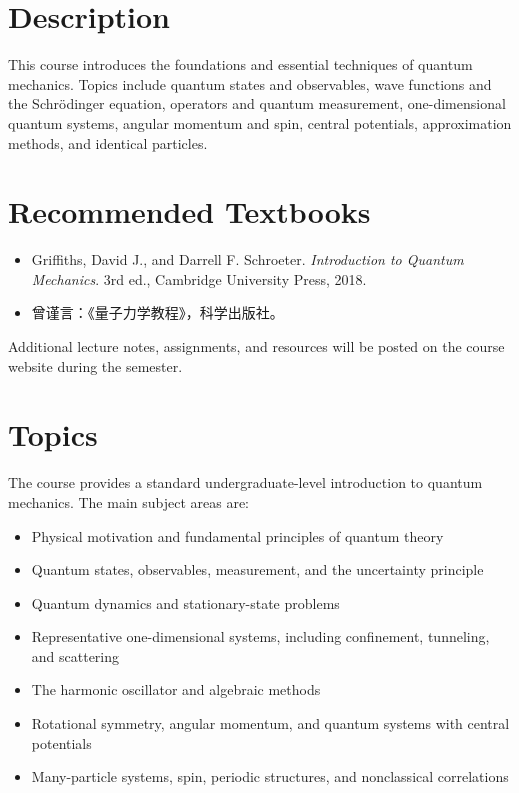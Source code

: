 \documentclass[UTF8]{ctexart}
\begin{document}
\section*{Description}
This course introduces the foundations and essential techniques of quantum mechanics. Topics include quantum states and observables, wave functions and the Schr\"odinger equation, operators and quantum measurement, one-dimensional quantum systems, angular momentum and spin, central potentials, approximation methods, and identical particles.

\section*{Recommended Textbooks}
\begin{itemize}
  \item Griffiths, David J., and Darrell F. Schroeter. \textit{Introduction to Quantum Mechanics}. 3rd ed., Cambridge University Press, 2018.
  \item 曾谨言：《量子力学教程》，科学出版社。
\end{itemize}

Additional lecture notes, assignments, and resources will be posted on the course website during the semester.

\section*{Topics}
The course provides a standard undergraduate-level introduction to quantum mechanics. The main subject areas are:
\begin{itemize}
  \item Physical motivation and fundamental principles of quantum theory
  \item Quantum states, observables, measurement, and the uncertainty principle
  \item Quantum dynamics and stationary-state problems
  \item Representative one-dimensional systems, including confinement, tunneling, and scattering
  \item The harmonic oscillator and algebraic methods
  \item Rotational symmetry, angular momentum, and quantum systems with central potentials
  \item Many-particle systems, spin, periodic structures, and nonclassical correlations
\end{itemize}
\end{document}
